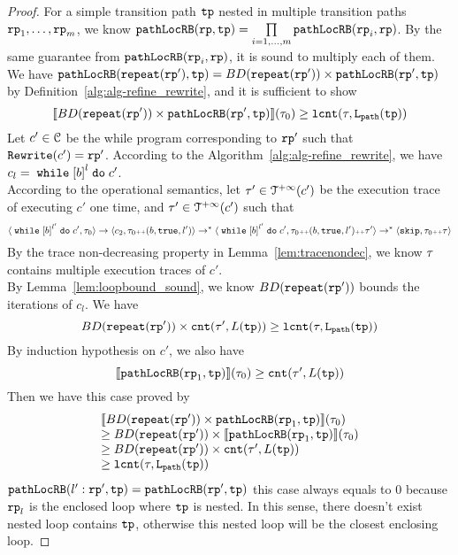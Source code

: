 \begin{proof}
{  For a simple transition path $\mathtt{tp}$ nested in multiple transition paths $\mathtt{rp}_1, \ldots, \mathtt{rp}_m$,
  we know $\mathtt{pathLocRB}(\mathtt{rp}, \mathtt{tp}) = \prod\limits_{i = 1, \ldots, m}\mathtt{pathLocRB}(\mathtt{rp}_i, \mathtt{rp})$.
  By the same guarantee from $\mathtt{pathLocRB}(\mathtt{rp}_i, \mathtt{rp})$, it is sound to multiply each of them.
}
\\
We have $\mathtt{pathLocRB}(\mathtt{repeat}(\mathtt{rp}'), \mathtt{tp}) = BD(\mathtt{repeat}(\mathtt{rp}')) \times \mathtt{pathLocRB}(\mathtt{rp}', \mathtt{tp})$
by Definition~\ref{alg:alg-refine_rewrite}, and
it is sufficient to show
\[
  \llbracket  BD(\mathtt{repeat}(\mathtt{rp}')) \times \mathtt{pathLocRB}(\mathtt{rp}', \mathtt{tp}) \rrbracket (\mathtt{\tau}_0) \geq \mathtt{lcnt}(\mathtt{\tau}, \mathtt{L}_{\mathtt{path}}(\mathtt{tp})) 
\]
Let $c' \in \mathcal{C}$ be the while program corresponding to $\mathtt{rp}'$ such that $\mathtt{Rewrite}(c') = \mathtt{rp}'$.
According to the Algorithm~\ref{alg:alg-refine_rewrite}, we have $c_l = \ewhile \clabel{\bexpr}^{l} \edo c'$.
\\
According to the operational semantics, let $\mathtt{\tau}' \in \mathcal{T}^{+\infty}(c')$ be the execution trace of executing $c'$ one time,
and $\mathtt{\tau}' \in \mathcal{T}^{+\infty}(c')$  such that 
\[
  \config{\ewhile \clabel{\bexpr}^{l'} \edo c', \trace_0} \to \config{c_2, \trace_0 \tracecat (\bexpr, \etrue, l')} \to^* \config{\ewhile \clabel{\bexpr}^{l'} \edo c', \trace_0 \tracecat (\bexpr, \etrue, l') \tracecat \trace'}
  \to^* \config{\eskip, \trace_0 \tracecat \trace}
\]
By the trace non-decreasing property in Lemma~\ref{lem:tracenondec}, we know $\mathtt{\tau}$ contains multiple execution traces of $c'$.
\\
By Lemma~\ref{lem:loopbound_sound}, we know $BD(\mathtt{repeat}(\mathtt{rp}'))$ bounds the iterations of $c_l$. We have
\[
  BD(\mathtt{repeat}(\mathtt{rp}')) \times \mathtt{cnt}(\mathtt{\tau}', L(\mathtt{tp}))  \geq \mathtt{lcnt}(\mathtt{\tau}, \mathtt{L}_{\mathtt{path}}(\mathtt{tp})) 
\]
By induction hypothesis on $c'$, we also have
\[
  \llbracket \mathtt{pathLocRB}(\mathtt{rp}_1, \mathtt{tp}) \rrbracket(\mathtt{\tau}_0) \geq \mathtt{cnt}(\mathtt{\tau}', L(\mathtt{tp})) 
\]
Then we have this case proved by
\[
  \begin{array}{l}
  \llbracket BD(\mathtt{repeat}(\mathtt{rp}')) \times \mathtt{pathLocRB}(\mathtt{rp}_1, \mathtt{tp}) \rrbracket(\mathtt{\tau}_0) 
  \\
  \geq
  BD(\mathtt{repeat}(\mathtt{rp}')) \times \llbracket \mathtt{pathLocRB}(\mathtt{rp}_1, \mathtt{tp}) \rrbracket(\mathtt{\tau}_0) 
  \\
  \geq BD(\mathtt{repeat}(\mathtt{rp}')) \times \mathtt{cnt}(\mathtt{\tau}', L(\mathtt{tp}))  
  \\
  \geq \mathtt{lcnt}(\mathtt{\tau}, \mathtt{L}_{\mathtt{path}}(\mathtt{tp})) 
  \end{array}
  \]
$\mathtt{pathLocRB}(l': \mathtt{rp}', \mathtt{tp}) = \mathtt{pathLocRB}(\mathtt{rp}', \mathtt{tp})$ 
this case always equals to $0$ because $\mathtt{rp}_l$ is the enclosed loop where $\mathtt{tp}$ is nested. In this sense, there doesn't exist nested loop contains $\mathtt{tp}$, otherwise this nested loop will be the closest enclosing loop.

\end{proof}